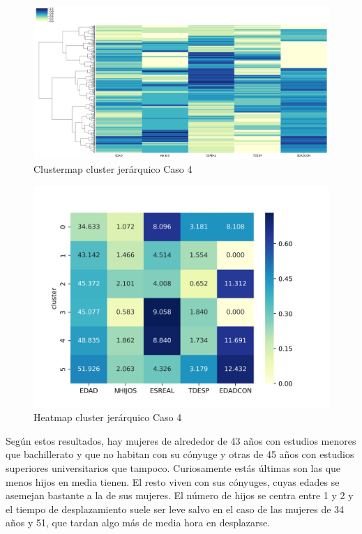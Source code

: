 \begin{figure}[H] %
	\centering
	\includegraphics[scale=0.4]{clustermap4.png}  %
	\caption{Clustermap cluster jerárquico Caso 4} 
	\label{fig:clustermap-caso4}
\end{figure}

\begin{figure}[H] %
	\centering
	\includegraphics[scale=0.7]{heatmap-jerarquico4.png}  %
	\caption{Heatmap cluster jerárquico Caso 4} 
	\label{fig:heatmapj-caso4}
\end{figure}

Según estos resultados, hay mujeres de alrededor de 43 años con estudios menores que bachillerato y que no habitan con su cónyuge y otras de 45 años con estudios superiores universitarios que tampoco. Curiosamente estás últimas son las que menos hijos en media tienen. El resto viven con sus cónyuges, cuyas edades se asemejan bastante a la de sus mujeres. El número de hijos se centra entre 1 y 2 y el tiempo de desplazamiento suele ser leve salvo en el caso de las mujeres de 34 años y 51, que tardan algo más de media hora en desplazarse. 

